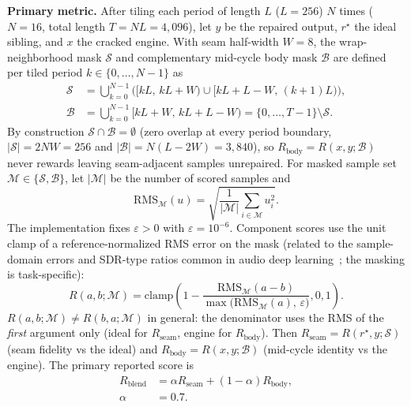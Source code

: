 \textbf{Primary metric.}
After tiling each period of length $L$ ($L{=}256$) $N$ times ($N{=}16$, total length $T{=}N L{=}4{,}096$), let $y$ be the repaired output, $r^{\star}$ the ideal sibling, and $x$ the cracked engine.
With seam half-width $W{=}8$, the wrap-neighborhood mask $\mathcal{S}$ and complementary mid-cycle body mask $\mathcal{B}$ are defined per tiled period $k\in\{0,\dots,N{-}1\}$ as
\begin{equation}
\label{eq:mask-SB}
\begin{aligned}
\mathcal{S} &= \bigcup_{k=0}^{N-1}\bigl([kL,\,kL{+}W)\cup[kL{+}L{-}W,\,(k{+}1)L)\bigr),\\
\mathcal{B} &= \bigcup_{k=0}^{N-1}[kL{+}W,\,kL{+}L{-}W) = \{0,\dots,T{-}1\}\setminus\mathcal{S}.
\end{aligned}
\end{equation}
By construction $\mathcal{S}\cap\mathcal{B}=\emptyset$ (zero overlap at every period boundary, $|\mathcal{S}|=2NW=256$ and $|\mathcal{B}|=N(L-2W)=3{,}840$), so $R_{\mathrm{body}}=R(x,y;\mathcal{B})$ never rewards leaving seam-adjacent samples unrepaired.
For masked sample set $\mathcal{M}\in\{\mathcal{S},\mathcal{B}\}$, let $|\mathcal{M}|$ be the number of scored samples and
\begin{equation}
\mathrm{RMS}_{\mathcal{M}}(u)=\sqrt{\frac{1}{|\mathcal{M}|}\sum_{i\in\mathcal{M}} u_i^2}.
\end{equation}
The implementation fixes $\varepsilon>0$ with $\varepsilon=10^{-6}$.
Component scores use the unit clamp of a reference-normalized RMS error on the mask (related to the sample-domain errors and SDR-type ratios common in audio deep learning~\citep{purwins2019}; the masking is task-specific):
\begin{equation}
\label{eq:R-component}
R(a,b;\mathcal{M})
=\mathrm{clamp}\!\left(
  1-\frac{\mathrm{RMS}_{\mathcal{M}}(a-b)}
         {\max\!\bigl(\mathrm{RMS}_{\mathcal{M}}(a),\,\varepsilon\bigr)},
  0,1\right).
\end{equation}
$R(a,b;\mathcal{M})\neq R(b,a;\mathcal{M})$ in general: the denominator uses the RMS of the \emph{first} argument only (ideal for $R_{\mathrm{seam}}$, engine for $R_{\mathrm{body}}$).
Then $R_{\mathrm{seam}}=R(r^{\star},y;\mathcal{S})$ (seam fidelity vs the ideal) and
$R_{\mathrm{body}}=R(x,y;\mathcal{B})$ (mid-cycle identity vs the engine).
The primary reported score is
\begin{equation}
\label{eq:R-blend}
\begin{aligned}
R_{\mathrm{blend}}
&=\alpha R_{\mathrm{seam}}+(1-\alpha)R_{\mathrm{body}},\\
\alpha&=0.7.
\end{aligned}
\end{equation}

